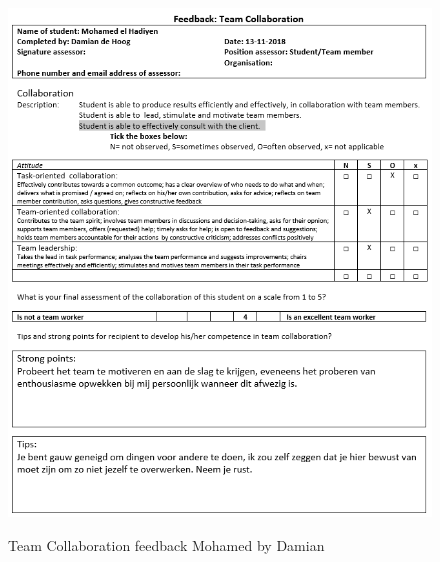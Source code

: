 \documentclass[12pt]{article}
\begin{document}
	\begin{figure}[p!]
		\centering
		\includegraphics[width=\columnwidth]{CoopMohamed.PNG}\\
		\caption{Team Collaboration feedback Mohamed by Damian}
	\end{figure}
\end{document}
